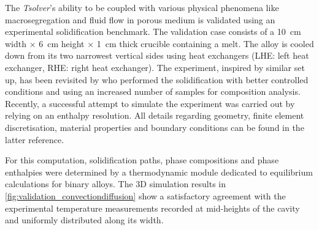 %

The \emph{Tsolver}’s ability to be coupled with various physical phenomena like macrosegregation and fluid flow 
in porous medium is validated using an experimental solidification benchmark. 
The validation case consists of a \SI{10}{\centi \metre}
width $\times$ \SI{6}{\centi \metre} height $\times$ \SI{1}{\centi \metre} thick crucible containing 
a  melt. The alloy is cooled down from its two 
narrowest vertical sides using heat exchangers (LHE: left heat exchanger, RHE: right heat exchanger). The 
experiment, inspired by \citet{hebditch_observations_1974} similar set up, has been 
revisited by \citet{hachani_experimental_2012} who performed the solidification with better 
controlled conditions and using an increased number of samples for composition analysis. Recently, a successful 
attempt to simulate the experiment was carried out by \citet{carozzani_direct_2013} relying on an enthalpy resolution. 
All details regarding geometry, finite element discretisation, material properties 
and boundary conditions can be found in the latter reference. 

For this computation, solidification paths, phase compositions and phase enthalpies were determined by a thermodynamic 
module dedicated to equilibrium calculations for binary alloys. 
The 3D simulation results in \cref{fig:validation_convectiondiffusion}
show a satisfactory agreement with the experimental temperature measurements recorded at mid-heights of the cavity and uniformly 
distributed along its width. 

